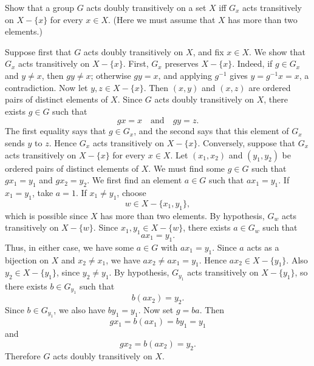 \documentclass[../Odyssey_Project.tex]{subfiles}
\begin{document}
\begin{exercise}
\label{ex:3.2}
Show that a group $G$ acts doubly transitively on a set $X$ iff $G_x$ acts transitively on $X - \{x\}$ for every $x \in X$. (Here we must assume that $X$ has more than two elements.)
\end{exercise}
\begin{solution}
    Suppose first that $G$ acts doubly transitively on $X$, and fix $x \in X$. We show that $G_x$ acts transitively on $X - \{x\}$.
    First, $G_x$ preserves $X - \{x\}$. Indeed, if $g \in G_x$ and $y \neq x$, then $gy \neq x$; otherwise $gy = x$, and applying $g^{-1}$ gives $y = g^{-1}x = x$, a contradiction.
    Now let $y,z \in X - \{x\}$. Then $(x,y)$ and $(x,z)$ are ordered pairs of distinct elements of $X$. Since $G$ acts doubly transitively on $X$, there exists $g \in G$ such that
    \[
        gx = x
        \quad\text{and}\quad
        gy = z.
    \]
    The first equality says that $g \in G_x$, and the second says that this element of $G_x$ sends $y$ to $z$. Hence $G_x$ acts transitively on $X - \{x\}$.
    Conversely, suppose that $G_x$ acts transitively on $X - \{x\}$ for every $x \in X$. Let $(x_1,x_2)$ and $(y_1,y_2)$ be ordered pairs of distinct elements of $X$. We must find some $g \in G$ such that $gx_1 = y_1$ and $gx_2 = y_2$.
    We first find an element $a \in G$ such that $ax_1 = y_1$. If $x_1 = y_1$, take $a = 1$. If $x_1 \neq y_1$, choose
    \[
        w \in X - \{x_1,y_1\},
    \]
    which is possible since $X$ has more than two elements. By hypothesis, $G_w$ acts transitively on $X - \{w\}$. Since $x_1,y_1 \in X - \{w\}$, there exists $a \in G_w$ such that
    \[
        ax_1 = y_1.
    \]
    Thus, in either case, we have some $a \in G$ with $ax_1 = y_1$.
    Since $a$ acts as a bijection on $X$ and $x_2 \neq x_1$, we have $ax_2 \neq ax_1 = y_1$. Hence $ax_2 \in X - \{y_1\}$. Also $y_2 \in X - \{y_1\}$, since $y_2 \neq y_1$. By hypothesis, $G_{y_1}$ acts transitively on $X - \{y_1\}$, so there exists $b \in G_{y_1}$ such that
    \[
        b(ax_2) = y_2.
    \]
    Since $b \in G_{y_1}$, we also have $by_1 = y_1$. Now set $g = ba$. Then
    \[
        gx_1 = b(ax_1) = by_1 = y_1
    \]
    and
    \[
        gx_2 = b(ax_2) = y_2.
    \]
    Therefore $G$ acts doubly transitively on $X$.
\end{solution}
\end{document}
